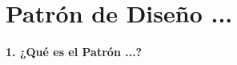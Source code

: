 \section{Patrón de Diseño ...} 
\textbf {1.    ¿Qué es el Patrón ...?}
\textbf{}\\

\begin{flushleft}
\begin{itemize}

	

\end{itemize} 


\end{flushleft}